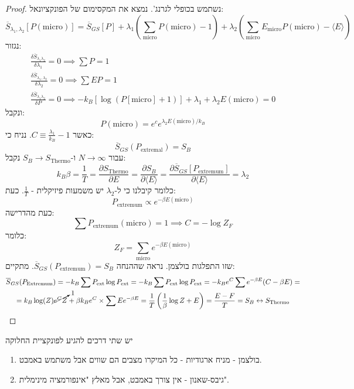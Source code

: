 \documentclass{tstextbook}
\begin{document}
\begin{proof}
נשתמש בכופלי לגרנג'. נמצא את המקסימום של הפונקציונאל:
$$\overline{S} _{\lambda_{1},\lambda_{2}}[P(\text{micro})]=\overline{S} _{GS}[P]+\lambda_{1}\left( \sum_{\text{micro}}P(\text{micro})-1 \right)+\lambda_{2}\left( \sum_{\text{micro}}E_{\text{micro}}P(\text{micro})-\langle E \rangle  \right)$$
נגזור:
\begin{gather*}\frac{\delta \overline{S}_{\lambda_{1}\lambda_{2}} }{\delta \lambda_{1}}=0\implies \sum P = 1 \\\frac{\delta \overline{S}_{\lambda_{1},\lambda_{2}}}{\delta \lambda_{2}}=0\implies \sum EP = 1 \\\frac{\delta \overline{S}_{\lambda_{1}\lambda_{2}}}{\delta P}=0\implies -k_{B}[\log(P[\text{micro}]+1)]+\lambda_{1}+\lambda_{2}E(\text{micro})=0 
\end{gather*}
ונקבל:
$$P(\text{micro})=e^{ c }e^{ \lambda_{2}E(\text{micro})/k_{B} }$$
כאשר \(C\equiv \frac{\lambda_{1}}{k_{B}}-1\). נניח כי:
$$\overline{S} _{GS}(P_{\text{extremal}})=S_{B}$$
עבור \(N\to \infty\) ו-\(S_{B}\to S_{\text{Thermo}}\) נקבל:
$$k_{B}\beta=\frac{1}{T} = \frac{\partial S_{\text{Thermo}}}{\partial E}=\frac{\partial S_{B}}{\partial \langle E \rangle }=\frac{\partial \overline{S}_{GS}[P_{\text{extremum}}]}{\partial \langle E \rangle }=\lambda_{2}$$
כלומר קיבלנו כי ל-\(\lambda_{2}\) יש משמעות פיזיקלית - \(\frac{1}{T}\). כעת:
$$P_{\text{extremum}}\propto e^{ -\beta E(\text{micro}) }$$
כעת מהדרישה:
$$\sum P_{\text{extremum}}(\text{micro})=1\implies C=-\log Z_{F}$$
כלומר:
$$Z_{F}=\sum_{\text{micro}}e^{ -\beta E(\text{micro}) }$$
שזו התפלגות בולצמן. נראה שההנחה \(\overline{S}_{GS}(P_{\text{extremum}})=S_{B}\). מתקיים:
\begin{gather*}\overline{S} _{GS}(P_{\text{Extremum}})=-k_{B}\sum P_{\text{ext}}\log P_{\text{ext}}=-k_{B}\sum P_{\text{ext}}\log P_{\text{ext}}=-k_{B}e^{ C }\sum e^{ -\beta E }(C-\beta E)= \\= k_{B}\log (Z )\cancelto{ 1 }{ e^{ C }Z } +\beta k_{B}e^{ C }\times \sum Ee^{ -\beta E }=\frac{1}{T}\left( \frac{1}{\beta}\log Z+E \right)=\frac{E-F}{T}=S_{B}\leftrightarrow  S_{\text{Thermo}}
\end{gather*}

\end{proof}
\begin{corollary}
יש שתי דרכים להגיע לפונקציית החלוקה

  \begin{enumerate}
    \item בולצמן - מניח ארגודיות - כל המיקרו מצבים הם שווים אבל משתמש באמבט. 


    \item גיבס-שאנון - אין צורך באמבט, אבל מאלץ "אינפורמציה מינימלית". 


  \end{enumerate}
\end{corollary}
\end{document}
